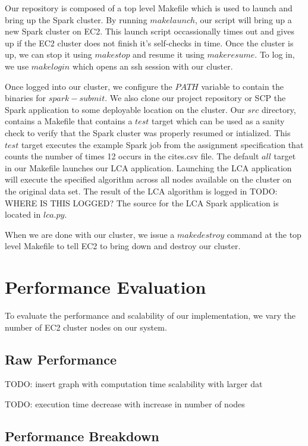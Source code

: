 \documentclass{article}
\begin{document}
Our repository is composed of a top level Makefile which is used to launch and bring up the Spark cluster.
By running $make launch$, our script will bring up a new Spark cluster on EC2.
This launch script occassionally times out and gives up if the EC2 cluster does not finish it's self-checks in time.
Once the cluster is up, we can stop it using $make stop$ and resume it using $make resume$.
To log in, we use $make login$ which opens an ssh session with our cluster.

Once logged into our cluster, we configure the $PATH$ variable to contain the binaries for $spark-submit$.
We also clone our project repository or SCP the Spark application to some deployable location on the cluster.
Our $src$ directory, contains a Makefile that contains a $test$ target which can be used as a sanity check to verify that the Spark cluster was properly resumed or intialized.
This $test$ target executes the example Spark job from the assignment specification that counts the number of times 12 occurs in the cites.csv file.
The default $all$ target in our Makefile launches our LCA application.
Launching the LCA application will execute the specified algorithm across all nodes available on the cluster on the original data set.
The result of the LCA algorithm is logged in TODO: WHERE IS THIS LOGGED?
The source for the LCA Spark application is located in $lca.py$.

When we are done with our cluster, we issue a $make destroy$ command at the top level Makefile to tell EC2 to bring down and destroy our cluster.

\section{Performance Evaluation}

To evaluate the performance and scalability of our implementation, we vary the number of EC2 cluster nodes on our system. 

\subsection{Raw Performance}



TODO: insert graph with computation time scalability with larger dat

TODO: execution time decrease with increase in number of nodes

\subsection{Performance Breakdown}
\end{document}
